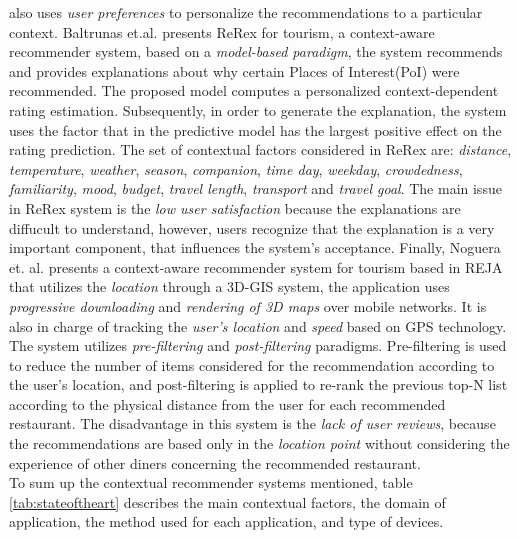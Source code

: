 also uses \textit{user preferences} to personalize the recommendations
to a particular context.
Baltrunas et.al.\cite{baltrunas2011context} presents ReRex for tourism, 
a context-aware recommender system, based on a 
\textit{model-based paradigm}, the system recommends and provides 
explanations about why certain Places of Interest(PoI) were recommended. 
The proposed model computes a 
personalized context-dependent rating estimation. Subsequently, in
order to generate the explanation, the system uses
the factor that in the predictive model has the largest positive
effect on the rating prediction. The set of
contextual factors considered in ReRex are: \textit{distance},
\textit{temperature}, \textit{weather}, \textit{season}, \textit{companion}, 
\textit{time day}, \textit{weekday}, \textit{crowdedness}, \textit{familiarity}, 
\textit{mood}, \textit{budget}, \textit{travel length}, \textit{transport} and
\textit{travel goal}. The main issue in ReRex system is the \textit{low user
satisfaction} because the explanations are diffucult to understand,
however, users recognize that the explanation is a very important
component, that influences the system's acceptance. 
Finally, Noguera et. al. \cite{noguera2012mobile} presents a context-aware
recommender system for tourism based in REJA that utilizes the 
\textit{location} through a 3D-GIS system, the application uses 
\textit{progressive downloading} and \textit{rendering of
3D maps} over mobile networks. It is also in charge of tracking the
\textit{user's location} and \textit{speed} based on GPS technology. 
The system utilizes \textit{pre-filtering} and \textit{post-filtering} paradigms. 
Pre-filtering is used to reduce the number of items considered for the
recommendation according to the user's location, and  post-filtering
is applied to re-rank the previous top-N list according to the
physical distance from the user for each recommended restaurant. The
disadvantage in this system is the \textit{lack of user reviews},
because the recommendations are based only in the \textit{location
point} without considering the experience of other diners concerning the
recommended restaurant.\\ To sum up the contextual recommender 
systems mentioned, table \ref{tab:stateoftheart} describes the main 
contextual factors, the domain of application, the method used for each 
application, and type of devices.
